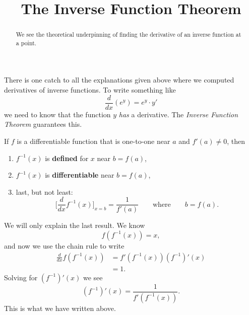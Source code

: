 \documentclass{ximera}
\title[Dig-In:]{The Inverse Function Theorem}
\begin{document}
\begin{abstract}
  We see the theoretical underpinning of finding the derivative of an
  inverse function at a point.
\end{abstract}
\maketitle

There is one catch to all the explanations given above where we
computed derivatives of inverse functions. To write something like
\[
\frac{d}{dx}(e^y)=e^y\cdot y'
\]
we need to know that the function $y$ \textit{has} a derivative.  The
\textit{Inverse Function Theorem} guarantees this.

\begin{theorem}\label{theorem:IFT}
If $f$ is a differentiable function that is one-to-one near $a$ and
$f'(a) \neq 0$, then
\begin{enumerate}
\item $f^{-1}(x)$ is \textbf{defined} for $x$ near $b=f(a)$,
\item $f^{-1}(x)$ is \textbf{differentiable} near $b=f(a)$, 
\item last, but not least:
  \[
  \bigg[ \frac{d}{dx} f^{-1}(x) \bigg]_{x=b}  = \frac{1}{f'(a)}\qquad\text{where}\qquad b = f(a).
  \]
\end{enumerate}
\begin{explanation}
  We will only explain the last result. We know
  \[
  f(f^{-1}(x)) = x,
  \]
  and now we use the chain rule to
  write
  \begin{align*}
  \frac{d}{dx} f(f^{-1}(x)) &= f'(f^{-1}(x)) (f^{-1})'(x)\\
  &=1.
  \end{align*}
  Solving for $(f^{-1})'(x)$ we see
  \[
  (f^{-1})'(x) = \frac{1}{f'(f^{-1}(x))}.
  \]
  This is what we have written above.
\end{explanation}
\end{theorem}
\end{document}

